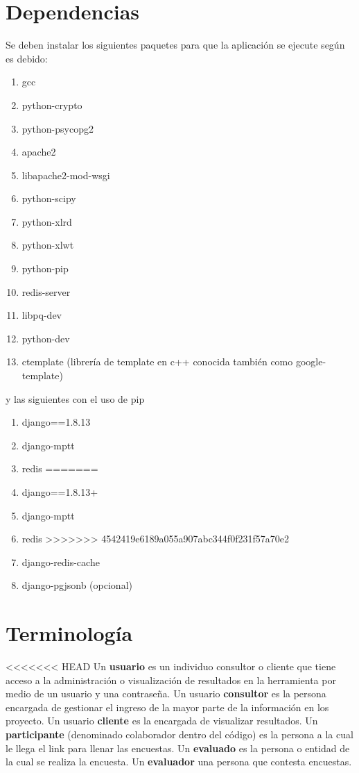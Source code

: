 \documentclass[10pt,a4paper]{book}
\begin{document}
	\section{Dependencias}

	Se deben instalar los siguientes paquetes para que la aplicación se ejecute según es debido:

	\begin{enumerate}
		\item gcc
		\item python-crypto
		\item python-psycopg2
		\item apache2
		\item libapache2-mod-wsgi
		\item python-scipy
		\item python-xlrd
		\item python-xlwt
		\item python-pip
		\item redis-server
		\item libpq-dev
		\item python-dev
		\item ctemplate (librería de template en c++ conocida también como google-template)
	\end{enumerate}

	y las siguientes con el uso de pip
	\begin{enumerate}
<<<<<<< HEAD
		\item django==1.8.13
		\item django-mptt
		\item redis
=======
		\item django==1.8.13+ 
		\item django-mptt 
		\item redis 
>>>>>>> 4542419e6189a055a907abc344f0f231f57a70e2
		\item django-redis-cache
		\item django-pgjsonb (opcional)
	\end{enumerate}

	\section{Terminología}
<<<<<<< HEAD
	Un \textbf{usuario} es un individuo consultor o cliente que tiene acceso a la administración o visualización de resultados en la herramienta por medio de un usuario y una contraseña. Un usuario \textbf{consultor} es la persona encargada de gestionar el ingreso de la mayor parte de la información en los proyecto. Un usuario \textbf{cliente} es la encargada de visualizar resultados. Un \textbf{participante} (denominado colaborador dentro del código) es la persona a la cual le llega el link para llenar las encuestas. Un \textbf{evaluado} es la persona o entidad de la cual se realiza la encuesta. Un \textbf{evaluador} una persona que contesta encuestas.
\end{document}
